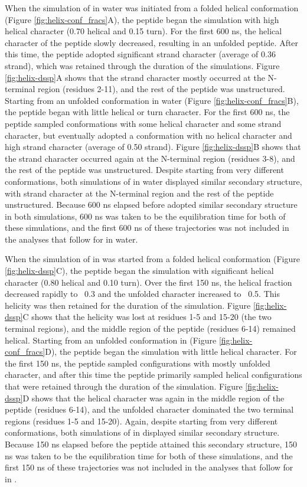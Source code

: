 When the simulation of \pep{} in water was initiated from a folded helical conformation (Figure \ref{fig:helix-conf_fracs}A), the peptide began the simulation with high helical character (0.70 helical and 0.15 turn). 
For the first 600 ns, the helical character of the peptide slowly decreased, resulting in an unfolded peptide. 
After this time, the peptide adopted significant strand character (average of 0.36 strand), which was retained through the duration of the simulations. 
Figure \ref{fig:helix-dssp}A shows that the strand character mostly occurred at the N-terminal region (residues 2-11), and the rest of the peptide was unstructured. 
Starting from an unfolded conformation in water (Figure \ref{fig:helix-conf_fracs}B), the peptide began with little helical or turn character. 
For the first 600 ns, the peptide sampled conformations with some helical character and some strand character, but eventually adopted a conformation with no helical character and high strand character (average of 0.50 strand). 
Figure \ref{fig:helix-dssp}B shows that the strand character occurred again at the N-terminal region (residues 3-8), and the rest of the peptide was unstructured. 
Despite starting from very different conformations, both simulations of \pep{} in water displayed similar secondary structure, with strand character at the N-terminal region and the rest of the peptide unstructured. 
Because 600 ns elapsed before \pep{} adopted similar secondary structure in both simulations, 600 ns was taken to be the equilibration time for both of these simulations, and the first 600 ns of these trajectories was not included in the analyses that follow for \pep{} in water.

When the simulation of \pep{} in \tbawat{} was started from a folded helical conformation (Figure \ref{fig:helix-dssp}C), the peptide began the simulation with significant helical character (0.80 helical and 0.10 turn). 
Over the first 150 ns, the helical fraction decreased rapidly to ~0.3 and the unfolded character increased to ~0.5. 
This helicity was then retained for the duration of the simulation. 
Figure \ref{fig:helix-dssp}C shows that the helicity was lost at residues 1-5 and 15-20 (the two terminal regions), and the middle region of the peptide (residues 6-14) remained helical. 
Starting from an unfolded conformation in \tbawat{} (Figure \ref{fig:helix-conf_fracs}D), the peptide began the simulation with little helical character. 
For the first 150 ns, the peptide sampled configurations with mostly unfolded character, and after this time the peptide primarily sampled helical configurations that were retained through the duration of the simulation. 
Figure \ref{fig:helix-dssp}D shows that the helical character was again in the middle region of the peptide (residues 6-14), and the unfolded character dominated the two terminal regions (residues 1-5 and 15-20). 
Again, despite starting from very different conformations, both simulations of \pep{} in \tbawat{} displayed similar secondary structure. 
Because 150 ns elapsed before the peptide attained this secondary structure, 150 ns was taken to be the equilibration time for both of these simulations, and the first 150 ns of these trajectories was not included in the analyses that follow for \pep{} in \tbawat{}. 

